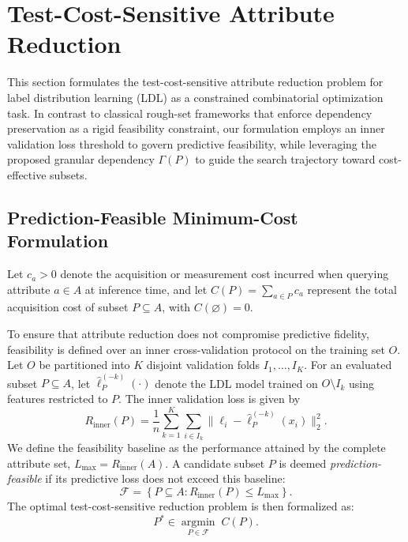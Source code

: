 \section{Test-Cost-Sensitive Attribute Reduction}
\label{sec:formal-method}
This section formulates the test-cost-sensitive attribute reduction problem for label distribution learning (LDL) as a constrained combinatorial optimization task. In contrast to classical rough-set frameworks that enforce dependency preservation as a rigid feasibility constraint, our formulation employs an inner validation loss threshold to govern predictive feasibility, while leveraging the proposed granular dependency $\Gamma(P)$ to guide the search trajectory toward cost-effective subsets.

\subsection{Prediction-Feasible Minimum-Cost Formulation}
Let $c_a > 0$ denote the acquisition or measurement cost incurred when querying attribute $a \in A$ at inference time, and let $C(P) = \sum_{a \in P} c_a$ represent the total acquisition cost of subset $P \subseteq A$, with $C(\varnothing) = 0$.

To ensure that attribute reduction does not compromise predictive fidelity, feasibility is defined over an inner cross-validation protocol on the training set $O$. Let $O$ be partitioned into $K$ disjoint validation folds $I_1, \dots, I_K$. For an evaluated subset $P \subseteq A$, let $\widehat{\boldsymbol{\ell}}^{(-k)}_P(\cdot)$ denote the LDL model trained on $O \setminus I_k$ using features restricted to $P$. The inner validation loss is given by
\begin{equation}
	R_{\mathrm{inner}}(P) = \frac{1}{n} \sum_{k=1}^K \sum_{i \in I_k} \|\boldsymbol{\ell}_i - \widehat{\boldsymbol{\ell}}^{(-k)}_P(x_i)\|_2^2.
	\label{eq:inner-loss}
\end{equation}
We define the feasibility baseline as the performance attained by the complete attribute set, $L_{\max} = R_{\mathrm{inner}}(A)$. A candidate subset $P$ is deemed \emph{prediction-feasible} if its predictive loss does not exceed this baseline:
\begin{equation}
	\mathcal{F} = \left\{ P \subseteq A : R_{\mathrm{inner}}(P) \le L_{\max} \right\}.
	\label{eq:feasible-set}
\end{equation}
The optimal test-cost-sensitive reduction problem is then formalized as:
\begin{equation}
	P^* \in \underset{P \in \mathcal{F}}{\operatorname{argmin}} \; C(P).
	\label{eq:formal-cost-objective}
\end{equation}

